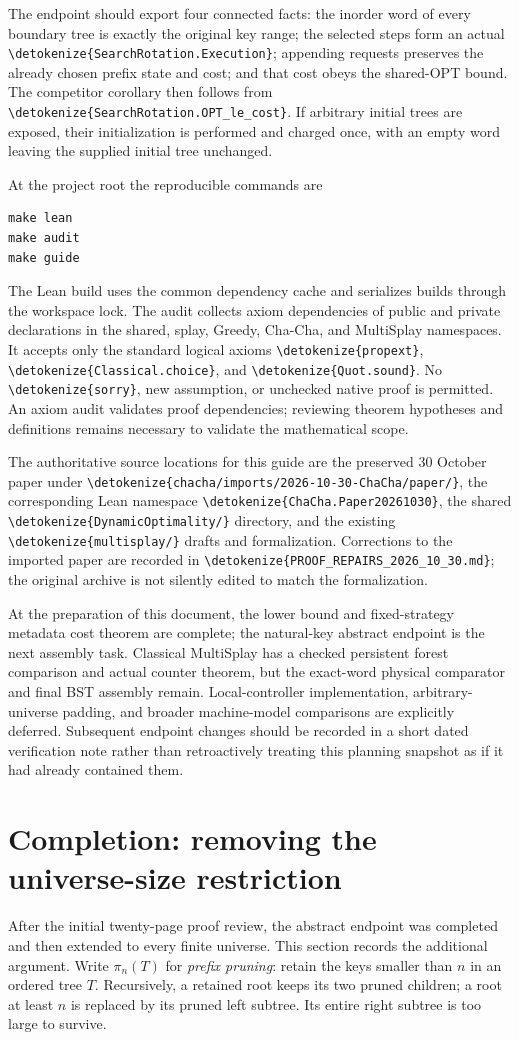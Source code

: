 \documentclass[11pt,a4paper]{article}
\newcommand{\lean}[1]{{\small\expandafter\nolinkurl\expandafter{\detokenize{#1}}}}
\newcommand{\nextpage}{\clearpage}
\begin{document}
The endpoint should export four connected facts: the inorder word of
every boundary tree is exactly the original key range; the selected
steps form an actual \lean{SearchRotation.Execution}; appending requests
preserves the already chosen prefix state and cost; and that cost obeys
the shared-OPT bound. The competitor corollary then follows from
\lean{SearchRotation.OPT_le_cost}. If arbitrary initial trees are exposed,
their initialization is performed and charged once, with an empty word
leaving the supplied initial tree unchanged.

At the project root the reproducible commands are
\begin{verbatim}
make lean
make audit
make guide
\end{verbatim}
The Lean build uses the common dependency cache and serializes builds
through the workspace lock. The audit collects axiom dependencies of
public and private declarations in the shared, splay, Greedy, Cha-Cha, and
MultiSplay namespaces. It accepts only the standard logical axioms
\lean{propext}, \lean{Classical.choice}, and \lean{Quot.sound}.
No \lean{sorry}, new assumption, or unchecked native proof is permitted.
An axiom audit validates proof dependencies; reviewing theorem hypotheses
and definitions remains necessary to validate the mathematical scope.

The authoritative source locations for this guide are the preserved
30 October paper under \lean{chacha/imports/2026-10-30-ChaCha/paper/},
the corresponding Lean namespace \lean{ChaCha.Paper20261030},
the shared \lean{DynamicOptimality/} directory, and the existing
\lean{multisplay/} drafts and formalization. Corrections to the imported
paper are recorded in \lean{PROOF_REPAIRS_2026_10_30.md}; the original
archive is not silently edited to match the formalization.

At the preparation of this document, the lower bound and fixed-strategy
metadata cost theorem are complete; the natural-key abstract endpoint
is the next assembly task. Classical MultiSplay has a checked persistent
forest comparison and actual counter theorem, but the exact-word physical
comparator and final BST assembly remain. Local-controller implementation,
arbitrary-universe padding, and broader machine-model comparisons are
explicitly deferred. Subsequent endpoint changes should be recorded in
a short dated verification note rather than retroactively treating this
planning snapshot as if it had already contained them.
\nextpage
\section{Completion: removing the universe-size restriction}\label{sec:padding}
After the initial twenty-page proof review, the abstract endpoint was
completed and then extended to every finite universe. This section records
the additional argument. Write $\pi_n(T)$ for \emph{prefix pruning}: retain
the keys smaller than $n$ in an ordered tree $T$. Recursively, a retained
root keeps its two pruned children; a root at least $n$ is replaced by
its pruned left subtree. Its entire right subtree is too large to survive.
\end{document}
